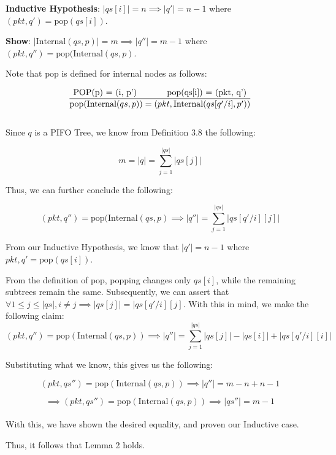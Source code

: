 \documentclass{article}
\begin{document}
\noindent \textbf{Inductive Hypothesis}: $|qs[i]| = n \implies |q'| = n-1$ where $(pkt, q') = \text{pop}(qs[i])$.\newline

\noindent \textbf{Show}: $|\text{Internal}(qs, p)| = m \implies |q''| = m-1$ where $(pkt, q'') =\text{pop}(\text{Internal}(qs, p)$.\newline

\noindent Note that $\text{pop}$ is defined for internal nodes as follows:

$$\frac{\text{POP(p) = (i, p') \hspace{1cm} \text{pop}(qs[i]) = (pkt, q')}}{{\text{pop}(\text{Internal}(qs, p)) = (pkt, \text{Internal}(qs[q'/i], p'))}}$$\\[-10pt]

\noindent Since $q$ is a PIFO Tree, we know from Definition 3.8 the following:

$$m = |q| = \sum_{j=1}^{|qs|} |qs[j]|$$

\noindent Thus, we can further conclude the following:

$$(pkt, q'') = \text{pop}(\text{Internal}(qs, p) \implies |q''| = \sum_{j=1}^{|qs|} |qs[q'/i][j]|$$

\noindent From our Inductive Hypothesis, we know that $|q'| = n-1$ where $pkt, q' = \text{pop}(qs[i])$.\newline

\noindent From the definition of $\text{pop}$, popping changes only $qs[i]$, while the remaining subtrees remain the same. Subsequently, we can assert that $\forall 
1 \leq j \leq |qs|, i \neq j \implies |qs[j]| = |qs[q'/i][j]$. With this in mind, we make the following claim:\\[-15pt]

$$(pkt, q'') = \text{pop}(\text{Internal}(qs, p)) \implies |q''| = \sum_{j=1}^{|qs|} |qs[j]| - |qs[i]| + |qs[q'/i][i]|$$

\noindent Substituting what we know, this gives us the following:

$$(pkt, qs'') = \text{pop}(\text{Internal}(qs, p)) \implies |q''| = m - n + n - 1$$

$$\implies (pkt, qs'') = \text{pop}(\text{Internal}(qs, p)) \implies |qs''| = m - 1$$\\[-15pt]

\noindent With this, we have shown the desired equality, and proven our Inductive case.\newline

\noindent Thus, it follows that Lemma 2 holds.\newline
\end{document}
